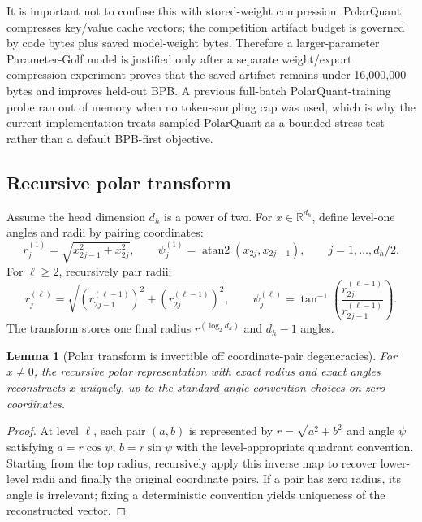 \documentclass[11pt]{article}
\theoremstyle{definition}
\theoremstyle{plain}
\newtheorem{lemma}[definition]{Lemma}
\theoremstyle{remark}
\numberwithin{equation}{section}
\newcommand{\R}{\mathbb{R}}
\begin{document}
It is important not to confuse this with stored-weight compression.  PolarQuant
compresses key/value cache vectors; the competition artifact budget is governed
by code bytes plus saved model-weight bytes.  Therefore a larger-parameter
Parameter-Golf model is justified only after a separate weight/export
compression experiment proves that the saved artifact remains under
16,000,000 bytes and improves held-out BPB.  A previous full-batch
PolarQuant-training probe ran out of memory when no token-sampling cap was
used, which is why the current implementation treats sampled PolarQuant as a
bounded stress test rather than a default BPB-first objective.

\subsection{Recursive polar transform}

Assume the head dimension $d_h$ is a power of two.  For $x\in\R^{d_h}$, define level-one angles and radii by pairing coordinates:
\begin{equation}
  r_j^{(1)}=\sqrt{x_{2j-1}^2+x_{2j}^2},\qquad
  \psi_j^{(1)}=\operatorname{atan2}(x_{2j},x_{2j-1}),
  \qquad j=1,\ldots,d_h/2.
\end{equation}
For $\ell\ge2$, recursively pair radii:
\begin{equation}
  r_j^{(\ell)}=\sqrt{(r_{2j-1}^{(\ell-1)})^2+(r_{2j}^{(\ell-1)})^2},\qquad
  \psi_j^{(\ell)}=\tan^{-1}\left(\frac{r_{2j}^{(\ell-1)}}{r_{2j-1}^{(\ell-1)}}\right).
\end{equation}
The transform stores one final radius $r^{(\log_2 d_h)}$ and $d_h-1$ angles.

\begin{lemma}[Polar transform is invertible off coordinate-pair degeneracies]
For $x\ne0$, the recursive polar representation with exact radius and exact angles reconstructs $x$ uniquely, up to the standard angle-convention choices on zero coordinates.
\end{lemma}

\begin{proof}
At level $\ell$, each pair $(a,b)$ is represented by $r=\sqrt{a^2+b^2}$ and angle $\psi$ satisfying $a=r\cos\psi$, $b=r\sin\psi$ with the level-appropriate quadrant convention.  Starting from the top radius, recursively apply this inverse map to recover lower-level radii and finally the original coordinate pairs.  If a pair has zero radius, its angle is irrelevant; fixing a deterministic convention yields uniqueness of the reconstructed vector.
\end{proof}
\end{document}
